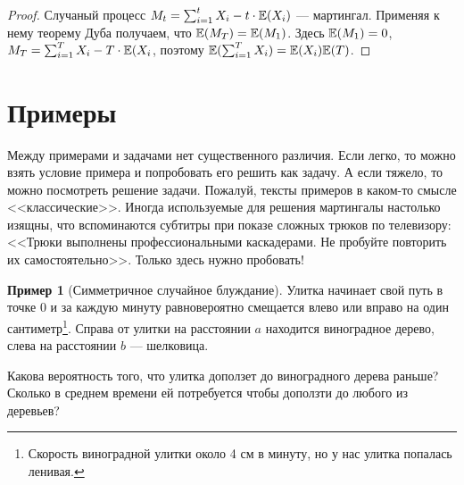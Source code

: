 \documentclass[pdftex,12pt,a4paper]{article}
\numberwithin{equation}{page} %
\theoremstyle{definition} %
\theoremstyle{definition}
\newtheorem{example}[equation]{Пример}
\theoremstyle{definition}
\theoremstyle{definition}
\begin{document}
\begin{proof}
Случаный процесс $M_{t}=\sum_{i=1}^{t}X_{i}-t\cdot \mathbb{E}(X_{i})$ --- мартингал. Применяя к нему теорему Дуба получаем, что $\mathbb{E}(M_{T})=\mathbb{E}(M_{1})$. Здесь $\mathbb{E}(M_{1})=0$, $M_{T}=\sum_{i=1}^{T}X_{i}-T\cdot \mathbb{E}(X_{i}$, поэтому $\mathbb{E}(\sum_{i=1}^{T}X_{i})=\mathbb{E}(X_{i})\mathbb{E}(T)$.
\end{proof}




\section{Примеры}

Между примерами и задачами нет существенного различия. Если легко, то можно взять условие примера и попробовать его решить как задачу. А если тяжело, то можно посмотреть решение задачи. Пожалуй, тексты примеров в каком-то смысле <<классические>>. Иногда используемые для решения мартингалы настолько изящны, что вспоминаются субтитры при показе сложных трюков по телевизору: <<Трюки выполнены профессиональными каскадерами. Не пробуйте повторить их самостоятельно>>. Только здесь нужно пробовать!



\begin{example}[Симметричное случайное блуждание]

Улитка начинает свой путь в точке 0 и за каждую минуту равновероятно смещается влево или вправо на один сантиметр\footnote{Скорость виноградной улитки около 4 см в минуту, но у нас улитка попалась ленивая.}. Справа от улитки на расстоянии $a$ находится виноградное дерево, слева на расстоянии $b$ --- шелковица.

Какова вероятность того, что улитка доползет до виноградного дерева раньше? Сколько в среднем времени ей потребуется чтобы доползти до любого из деревьев?
\end{example}
\end{document}
